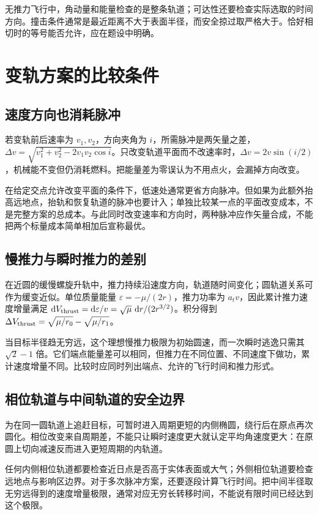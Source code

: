 无推力飞行中，角动量和能量检查的是整条轨道；可达性还要检查实际选取的时间方向。撞击条件通常是最近距离不大于表面半径，而安全掠过取严格大于。恰好相切时的等号能否允许，应在题设中明确。


\section{变轨方案的比较条件}
\subsection{速度方向也消耗脉冲}

  若变轨前后速率为 $v_1,v_2$，方向夹角为 $i$，所需脉冲是两矢量之差，$\Delta v=\sqrt{v_1^2+v_2^2-2v_1v_2\cos i}$。只改变轨道平面而不改速率时，$\Delta v=2v\sin(i/2)$，机械能不变但仍消耗燃料。把能量差为零误认为不用点火，会漏掉方向改变。

  在给定交点允许改变平面的条件下，低速处通常更省方向脉冲。但如果为此额外抬高远地点，抬轨和恢复轨道的脉冲也要计入；单独比较某一点的平面改变成本，不是完整方案的总成本。与此同时改变速率和方向时，两种脉冲应作矢量合成，不能把两个标量成本简单相加后宣称最优。
  
\subsection{慢推力与瞬时推力的差别}

  在近圆的缓慢螺旋升轨中，推力持续沿速度方向，轨道随时间变化；圆轨道关系可作为缓变近似。单位质量能量 $\varepsilon=-\mu/(2r)$，推力功率为 $a_tv$，因此累计推力速度增量满足 $\mathop{}\!\mathrm d V_{\rm thrust}=\mathop{}\!\mathrm d\varepsilon/v=\sqrt\mu\,\mathop{}\!\mathrm d r/(2r^{3/2})$。积分得到 $\Delta V_{\rm thrust}=\sqrt{\mu/r_0}-\sqrt{\mu/r_1}$。

  当目标半径趋无穷远，这个理想慢推力极限为初始圆速，而一次瞬时逃逸只需其 $\sqrt2-1$ 倍。它们端点能量差可以相同，但推力在不同位置、不同速度下做功，累计速度增量不同。比较时应同时列出端点、允许的飞行时间和推力形式。
  
\subsection{相位轨道与中间轨道的安全边界}

  为在同一圆轨道上追赶目标，可暂时进入周期更短的内侧椭圆，绕行后在原点再次圆化。相位改变来自周期差，不能只让瞬时速度更大就认定平均角速度更大：在原圆上切向减速反而进入更短周期的内轨道。

  任何内侧相位轨道都要检查近日点是否高于实体表面或大气；外侧相位轨道要检查远地点与影响区边界。对于多次脉冲方案，还要逐段计算飞行时间。把中间半径取无穷远得到的速度增量极限，通常对应无穷长转移时间，不能说有限时间已经达到这个极限。
  

